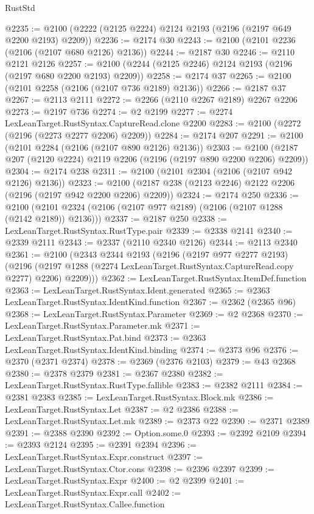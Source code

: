 \begin{lexlean}{RustStd}
\begin{coremodule}
@2235 := @2100 (@2222 (@2125 @2224) @2124 @2193 (@2196 (@2197 @649 @2200 @2193) @2209))
@2236 := @2174 @30
@2243 := @2100 (@2101 @2236 (@2106 (@2107 @680 @2126) @2136))
@2244 := @2187 @30
@2246 := @2110 @2121 @2126
@2257 := @2100 (@2244 (@2125 @2246) @2124 @2193 (@2196 (@2197 @680 @2200 @2193) @2209))
@2258 := @2174 @37
@2265 := @2100 (@2101 @2258 (@2106 (@2107 @736 @2189) @2136))
@2266 := @2187 @37
@2267 := @2113 @2111
@2272 := @2266 (@2110 @2267 @2189) @2267 @2206
@2273 := @2197 @736
@2274 := @2 @2199
@2277 := @2274 LexLeanTarget.RustSyntax.CaptureRead.clone @2200
@2283 := @2100 (@2272 (@2196 (@2273 @2277 @2206) @2209))
@2284 := @2174 @207
@2291 := @2100 (@2101 @2284 (@2106 (@2107 @890 @2126) @2136))
@2303 := @2100 (@2187 @207 (@2120 @2224) @2119 @2206 (@2196 (@2197 @890 @2200 @2206) @2209))
@2304 := @2174 @238
@2311 := @2100 (@2101 @2304 (@2106 (@2107 @942 @2126) @2136))
@2323 := @2100 (@2187 @238 (@2123 @2246) @2122 @2206 (@2196 (@2197 @942 @2200 @2206) @2209))
@2324 := @2174 @250
@2336 := @2100 (@2101 @2324 (@2106 (@2107 @977 @2189) (@2106 (@2107 @1288 (@2142 @2189)) @2136)))
@2337 := @2187 @250
@2338 := LexLeanTarget.RustSyntax.RustType.pair
@2339 := @2338 @2141
@2340 := @2339 @2111
@2343 := @2337 (@2110 @2340 @2126)
@2344 := @2113 @2340
@2361 := @2100
    (@2343
      @2344
      @2193
      (@2196
        (@2197 @977 @2277 @2193)
        (@2196 (@2197 @1288 (@2274 LexLeanTarget.RustSyntax.CaptureRead.copy @2277) @2206) @2209)))
@2362 := LexLeanTarget.RustSyntax.ItemDef.function
@2363 := LexLeanTarget.RustSyntax.Ident.generated
@2365 := @2363 LexLeanTarget.RustSyntax.IdentKind.function
@2367 := @2362 (@2365 @96)
@2368 := LexLeanTarget.RustSyntax.Parameter
@2369 := @2 @2368
@2370 := LexLeanTarget.RustSyntax.Parameter.mk
@2371 := LexLeanTarget.RustSyntax.Pat.bind
@2373 := @2363 LexLeanTarget.RustSyntax.IdentKind.binding
@2374 := @2373 @96
@2376 := @2370 (@2371 @2374)
@2378 := @2369 (@2376 @2103)
@2379 := @43 @2368
@2380 := @2378 @2379
@2381 := @2367 @2380
@2382 := LexLeanTarget.RustSyntax.RustType.fallible
@2383 := @2382 @2111
@2384 := @2381 @2383
@2385 := LexLeanTarget.RustSyntax.Block.mk
@2386 := LexLeanTarget.RustSyntax.Let
@2387 := @2 @2386
@2388 := LexLeanTarget.RustSyntax.Let.mk
@2389 := @2373 @22
@2390 := @2371 @2389
@2391 := @2388 @2390
@2392 := Option.some.{0}
@2393 := @2392 @2109
@2394 := @2393 @2124
@2395 := @2391 @2394
@2396 := LexLeanTarget.RustSyntax.Expr.construct
@2397 := LexLeanTarget.RustSyntax.Ctor.cons
@2398 := @2396 @2397
@2399 := LexLeanTarget.RustSyntax.Expr
@2400 := @2 @2399
@2401 := LexLeanTarget.RustSyntax.Expr.call
@2402 := LexLeanTarget.RustSyntax.Callee.function

\end{coremodule}
\end{lexlean}
